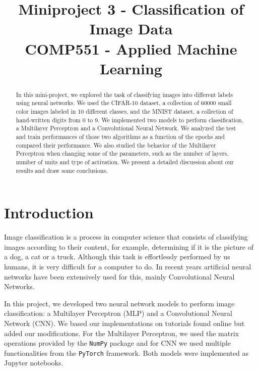 \documentclass[conference]{IEEEtran}
\begin{document}
\title{Miniproject 3 - Classification of Image Data \\
{\small COMP551 - Applied Machine Learning}
}

\author{
\and
{}
\and
{}
}

\maketitle

\begin{abstract}
In this mini-project, we explored the task of classifying images into different labels using neural networks. We used the CIFAR-10 dataset, a collection of 60000 small color images labeled in 10 different classes, and the MNIST dataset, a collection of hand-written digits from 0 to 9. We implemented two models to perform classification, a Multilayer Perceptron and a Convolutional Neural Network. We analyzed the test and train performances of those two algorithms as a function of the epochs and compared their performance. We also studied the behavior of the Multilayer Perceptron when changing some of the parameters, such as the number of layers, number of units and type of activation. We present a detailed discussion about our results and draw some conclusions.
\end{abstract}


\section{Introduction}
\label{section:introduction}

Image classification is a process in computer science that consists of classifying images according to their content, for example, determining if it is the picture of a dog, a cat or a truck. Although this task is effortlessly performed by us humans, it is very difficult for a computer to do. In recent years artificial neural networks have been extensively used for this, mainly Convolutional Neural Networks.

In this project, we developed two neural network models to perform image classification: a Multilayer Perceptron (MLP) and a Convolutional Neural Network (CNN). We based our implementations on tutorials found online but added our modifications. For the Multilayer Perceptron, we used the matrix operations provided by the \texttt{NumPy} package and for CNN we used multiple functionalities from the \texttt{PyTorch} framework. Both models were implemented as Jupyter notebooks.
\end{document}
